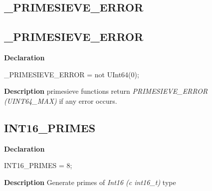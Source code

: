 \documentclass{report}
\newif\ifpdf
\begin{document}
\subsection*{\large{\textbf{{\_}PRIMESIEVE{\_}ERROR}}\normalsize\hspace{1ex}\hrulefill}
\else
\subsection*{{\_}PRIMESIEVE{\_}ERROR}
\fi
\label{primesieve-_PRIMESIEVE_ERROR}
\begin{list}{}{
\setlength{\itemindent}{0cm}
\setlength{\listparindent}{0cm}
\setlength{\leftmargin}{\evensidemargin}
\addtolength{\leftmargin}{\tmplength}
\settowidth{\labelsep}{X}
\addtolength{\leftmargin}{\labelsep}
\setlength{\labelwidth}{\tmplength}
}
\item[\textbf{Declaration}\hfill]
\ifpdf
\begin{flushleft}
\fi
\begin{ttfamily}
{\_}PRIMESIEVE{\_}ERROR = not UInt64(0);\end{ttfamily}

\ifpdf
\end{flushleft}
\fi

\par
\item[\textbf{Description}]
primesieve functions return \textit{PRIMESIEVE{\_}ERROR (UINT64{\_}MAX)} if any error occurs.

\end{list}
\ifpdf
\subsection*{\large{\textbf{INT16{\_}PRIMES}}\normalsize\hspace{1ex}\hrulefill}
\else
\subsection*{INT16{\_}PRIMES}
\fi
\label{primesieve-INT16_PRIMES}
\begin{list}{}{
\setlength{\itemindent}{0cm}
\setlength{\listparindent}{0cm}
\setlength{\leftmargin}{\evensidemargin}
\addtolength{\leftmargin}{\tmplength}
\settowidth{\labelsep}{X}
\addtolength{\leftmargin}{\labelsep}
\setlength{\labelwidth}{\tmplength}
}
\item[\textbf{Declaration}\hfill]
\ifpdf
\begin{flushleft}
\fi
\begin{ttfamily}
INT16{\_}PRIMES = 8;\end{ttfamily}

\ifpdf
\end{flushleft}
\fi

\par
\item[\textbf{Description}]
Generate primes of \textit{Int16 (c int16{\_}t)} type

\end{list}
\ifpdf
\end{document}
